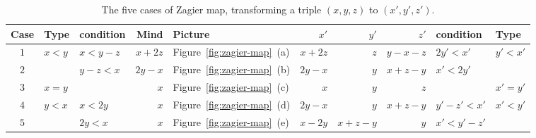 \documentclass[sigplan,screen]{acmart}
\begin{document}
\begin{table}[h] %
\caption{The five cases of Zagier map, transforming a triple $(x,y,z)$ to $(x',y',z')$.}
\label{tbl:zagier-map}  %
\begin{tabular}{c@{\quad}l@{\quad}l@{\quad}r@{\quad}l@{\quad}r@{\quad}r@{\quad}r@{\quad}l@{\quad}l}
Case & Type & condition & Mind & Picture & $x'$ & $y'$ & $z'$ & condition & Type\\
\hline
$1$ & \multirow{ 2}{*}{$x < y$} & $x < y - z$   & $x + 2z$ & Figure~\ref{fig:zagier-map}~(a)
    & $x + 2z$ & $z$ & $y - x - z$ & $2y' < x'$ & \multirow{ 2}{*}{$y' < x'$}\\
$2$ &  & $y - z < x$ & $2y - x$ & Figure~\ref{fig:zagier-map}~(b)
    & $2y - x$ & $y$ & $x + z - y$ & $x' < 2y'$ & \\
\hline
$3$ & $x = y$ &         & $x$ & Figure~\ref{fig:zagier-map}~(c)
    & $x$      & $y$ & $z$         &  & $x' = y'$\\
\hline
$4$ & \multirow{ 2}{*}{$y < x$} & $x < 2y$  & $x$ & Figure~\ref{fig:zagier-map}~(d)
    & $2y - x$ & $y$ & $x + z - y$ & $y' - z' < x'$ & \multirow{ 2}{*}{$x' < y'$}\\
$5$ & & $2y < x$    & $x$ & Figure~\ref{fig:zagier-map}~(e)
    & $x - 2y$ & $x + z - y$ & $y$ & $x' < y' - z'$ & \\ 
\hline
\end{tabular}
\end{table}
\end{document}
